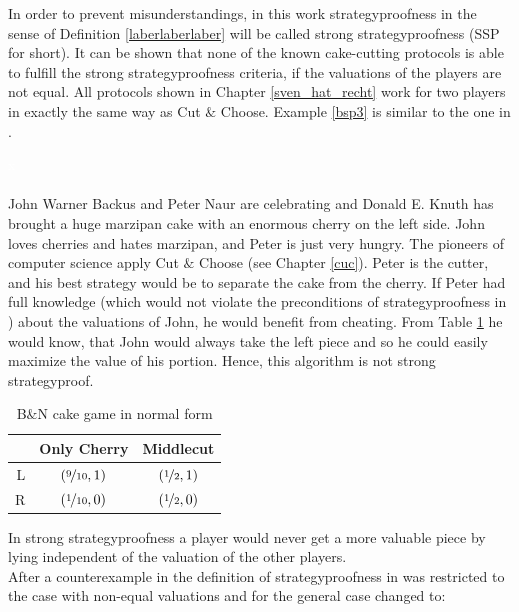 In order to prevent misunderstandings, in this work strategyproofness in the sense of Definition \ref{laberlaberlaber} will be called strong strategyproofness (SSP for short). It can be shown that none of the known cake-cutting protocols is able to fulfill the strong strategyproofness criteria, if the valuations of the players are not equal. All protocols shown in Chapter \ref{sven_hat_recht} work for two players in exactly the same way as Cut $\&$ Choose. Example \ref{bsp3} is similar to the one in \cite{chen:truth}.

\begin{bsp}
\label{bsp3}
\textcolor{white}{x}\\\\
John Warner Backus and Peter Naur are celebrating and Donald E. Knuth has brought a huge marzipan cake with an enormous cherry on the left side. John loves cherries and hates marzipan, and Peter is just very hungry. The pioneers of computer science apply Cut $\&$ Choose (see Chapter \ref{cuc}). Peter is the cutter, and his best strategy would be to separate the cake from the cherry. If Peter had full knowledge (which would not violate the preconditions of strategyproofness in \cite{why}) about the valuations of John, he would benefit from cheating. From Table \ref{Table4} he would know, that John would always take the left piece and so he could easily maximize the value of his portion. Hence, this algorithm is not strong strategyproof.  
\end{bsp}
\begin{table}[htb]
\centering
 \renewcommand{\arraystretch}{1.2} 
\begin{tabular}{c|c|c|}
\cline{2-3}
&\multicolumn{1}{|c|}{{Only Cherry}}& {Middlecut}\\
\hline
\multicolumn{1}{|r|}{{L}}&$\left(\nicefrac{9}{10}, 1\right)$&$\left(\nicefrac{1}{2}, 1\right)$\\
\hline
\multicolumn{1}{|r|}{{R}}&$\left(\nicefrac{1}{10}, 0\right)$&$\left(\nicefrac{1}{2}, 0\right)$\\
\hline
\end{tabular}
\caption{B$\&$N cake game in normal form}\label{Table4}
\end{table}
In strong strategyproofness a player would never get a more valuable piece by lying independent of the valuation of the other players.\\
\newline
After a counterexample in \cite{ccc} the definition of strategyproofness in \cite{pie} was restricted to the case with non-equal valuations and for the general case changed to:

